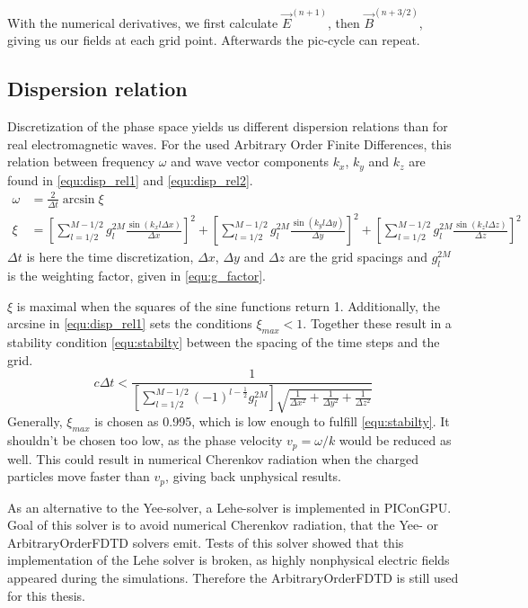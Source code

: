 \documentclass[bachelor_thesis]{subfiles}
\begin{document}
With the numerical derivatives, we first calculate $\vec{E}^{(n+1)}$, then $\vec{B}^{(n+3/2)}$, giving us our fields at each grid point. Afterwards the \gls{pic}-cycle can repeat.

\subsection{Dispersion relation}
Discretization of the phase space yields us different dispersion relations than for real  electromagnetic waves. For the used Arbitrary Order Finite Differences, this relation
between frequency $\omega$ and wave vector components $k_x$, $k_y$ and $k_z$ are found in \autoref{equ:disp_rel1} and \autoref{equ:disp_rel2}.
\begin{align}
\omega&=\frac{2}{\Delta t} \arcsin  \xi 			\label{equ:disp_rel1}	\\
\xi &= \left[\sum\limits_{l=1/2}^{M - 1/2} g_l^{2M} \frac{\sin( k_x l \Delta x)}{\Delta x} \right]^2
	+ \left[\sum\limits_{l=1/2}^{M - 1/2} g_l^{2M} \frac{\sin( k_y l \Delta y)}{\Delta y} \right]^2 + \left[\sum\limits_{l=1/2}^{M - 1/2} g_l^{2M} \frac{\sin( k_z l \Delta z)}{\Delta z} \right]^2 	\label{equ:disp_rel2}
\end{align}
$\Delta t$ is here the time discretization, $\Delta x$, $\Delta y$ and $\Delta z$ are the grid spacings and $g_l^{2M}$ is the weighting factor, given in \autoref{equ:g_factor}.

$\xi$ is maximal when the squares of the sine functions return 1. Additionally, the arcsine in \autoref{equ:disp_rel1} sets the conditions $\xi_{max} < 1$.
Together these result in a stability condition \autoref{equ:stabilty} between the spacing of the time steps and the grid.
\begin{equation}
c\Delta t < \frac{1}{ \left[ \sum\limits_{l=1/2}^{M - 1/2} (-1)^{l-\frac{1}{2}} g_l^{2M} \right] \sqrt{ \frac{1}{\Delta x^2} + \frac{1}{\Delta y^2} + \frac{1}{\Delta z^2} }}
\label{equ:stabilty}
\end{equation}
Generally, $\xi_{max}$ is chosen as 0.995, which is low enough to fulfill \autoref{equ:stabilty}. It shouldn't be chosen too low, as the phase velocity $v_p=\omega/k$
would be reduced as well. This could result in numerical Cherenkov radiation when the charged particles move faster than $v_p$, giving back unphysical results.

As an alternative to the Yee-solver, a Lehe-solver \cite{Lehe2013} is implemented in PIConGPU. Goal of this solver is to avoid numerical Cherenkov radiation, that the Yee- or ArbitraryOrderFDTD solvers emit.
Tests of this solver showed that this implementation of the Lehe solver is broken, as highly nonphysical electric fields appeared during the simulations. Therefore the ArbitraryOrderFDTD is still used for this thesis.
\end{document}
